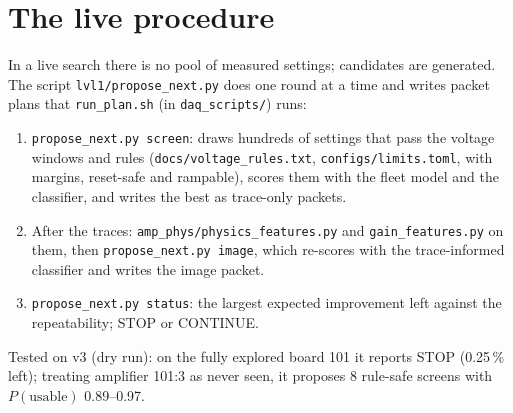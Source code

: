 \documentclass[11pt]{article}
\begin{document}
\section{The live procedure}
In a live search there is no pool of measured settings; candidates are generated. The script
\texttt{lvl1/propose\_next.py} does one round at a time and writes packet plans that \texttt{run\_plan.sh} (in
\texttt{daq\_scripts/}) runs:
\begin{center}
\end{center}
\begin{enumerate}
\item \texttt{propose\_next.py screen}: draws hundreds of settings that pass the voltage windows and rules
  (\texttt{docs/voltage\_rules.txt}, \texttt{configs/limits.toml}, with margins, reset-safe and rampable), scores them with
  the fleet model and the classifier, and writes the best as trace-only packets.
\item After the traces: \texttt{amp\_phys/physics\_features.py} and \texttt{gain\_features.py} on them, then
  \texttt{propose\_next.py image}, which re-scores with the trace-informed classifier and writes the image packet.
\item \texttt{propose\_next.py status}: the largest expected improvement left against the repeatability; STOP or CONTINUE.
\end{enumerate}
Tested on v3 (dry run): on the fully explored board 101 it reports STOP (0.25\,\% left); treating amplifier 101:3 as never
seen, it proposes 8 rule-safe screens with $P(\text{usable})$ 0.89--0.97.
\end{document}
